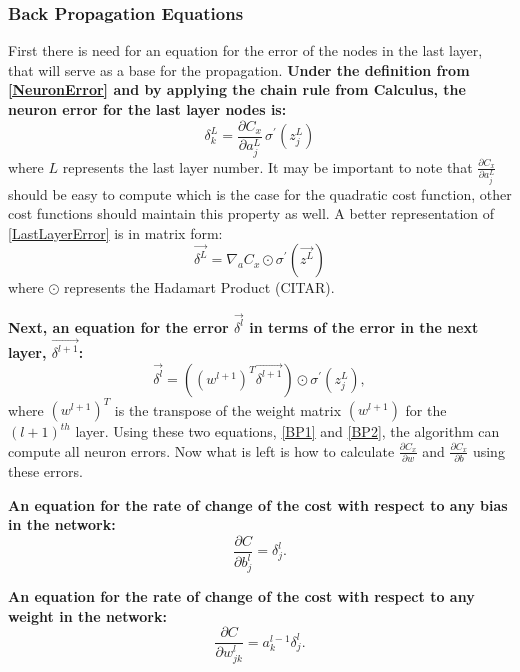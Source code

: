  \subsubsection{Back Propagation Equations}
 First there is need for an equation for the error of the nodes in the last layer, that will serve as a base for the propagation. \textbf{Under the definition from \ref{NeuronError} and by applying the chain rule from Calculus, the neuron error for the last layer nodes is:}
 \begin{equation}\label{LastLayerError}
 \delta_{k}^{L} = \frac{\partial C_x}{\partial a_{j}^{L}}\,\sigma^{\prime}\left(z_{j}^{L}\right)
 \end{equation}
 where $L$ represents the last layer number. It may be important to note that $\frac{\partial C_x}{\partial a_{j}^{L}}$ should be easy to compute which is the case for the quadratic cost function, other cost functions should maintain this property as well.
 A better representation of \ref{LastLayerError} is in matrix form:
 \begin{equation}\label{BP1}
 \vec{\delta^{L}}  = \nabla_{a}C_{x}\odot\sigma^{\prime}\left(\vec{z^L}\right)
 \end{equation}
 where $\odot$ represents the Hadamart Product (CITAR).
 
 \textbf{Next, an equation for the error $\vec{\delta^{l}}$ in terms of the error in the next layer, $\vec{\delta^{l+1}}$:}
 \begin{equation}\label{BP2}
 \vec{\delta^{l}} = \left(\left(w^{l+1}\right)^{T}\vec{\delta^{l+1}}\right)\odot\sigma^{\prime}\left(z_{j}^{L}\right),
 \end{equation}
 where $\left(w^{l+1}\right)^{T}$ is the transpose of the weight matrix $\left(w^{l+1}\right)$ for the $\left(l+1\right)^{th}$ layer. Using these two equations, \ref{BP1} and \ref{BP2}, the algorithm can compute all neuron errors. Now what is left is how to calculate $\frac{\partial C_x}{\partial w}$ and $\frac{\partial C_x}{\partial b}$ using these errors.
 
 \textbf{An equation for the rate of change of the cost with respect to any bias in the network:}
 \begin{equation}
 \label{BP3}
 \frac{\partial C}{\partial b^l_j} =
 \delta^l_j.
 \end{equation}


 \textbf{An equation for the rate of change of the cost with respect to any weight in the network:}
 \begin{equation}\label{BP4}
 \frac{\partial C}{\partial w^l_{jk}} = a^{l-1}_k \delta^l_j.
 \end{equation}
 
